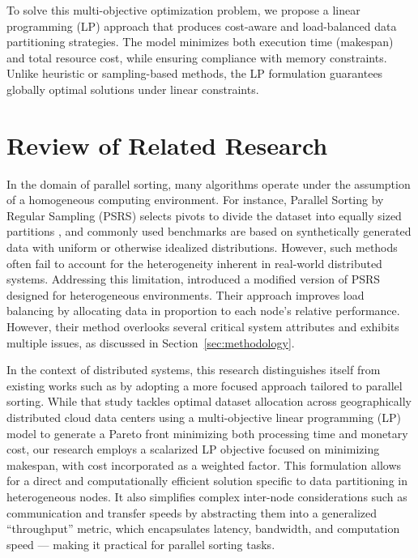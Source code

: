 \documentclass{article}
\begin{document}
To solve this multi-objective optimization problem, we propose a linear programming (LP) approach that produces cost-aware and load-balanced data partitioning strategies. The model minimizes both execution time (makespan) and total resource cost, while ensuring compliance with memory constraints. Unlike heuristic or sampling-based methods, the LP formulation guarantees globally optimal solutions under linear constraints. 

\vspace{3em}

\section{Review of Related Research}


In the domain of parallel sorting, many algorithms operate under the assumption of a homogeneous computing environment. For instance, Parallel Sorting by Regular Sampling (PSRS) selects pivots to divide the dataset into equally sized partitions \cite{tokuue_fugaku_2023}, and commonly used benchmarks are based on synthetically generated data with uniform or otherwise idealized distributions. However, such methods often fail to account for the heterogeneity inherent in real-world distributed systems. Addressing this limitation, \cite{monga_parallel_heterogeneous} introduced a modified version of PSRS designed for heterogeneous environments. Their approach improves load balancing by allocating data in proportion to each node's relative performance. However, their method overlooks several critical system attributes and exhibits multiple issues, as discussed in Section~\ref{sec:methodology}.

In the context of distributed systems, this research distinguishes itself from existing works such as \cite{yoon_optimal_2014} by adopting a more focused approach tailored to parallel sorting. While that study tackles optimal dataset allocation across geographically distributed cloud data centers using a multi-objective linear programming (LP) model to generate a Pareto front minimizing both processing time and monetary cost, our research employs a scalarized LP objective focused on minimizing makespan, with cost incorporated as a weighted factor. This formulation allows for a direct and computationally efficient solution specific to data partitioning in heterogeneous nodes. It also simplifies complex inter-node considerations such as communication and transfer speeds by abstracting them into a generalized “throughput” metric, which encapsulates latency, bandwidth, and computation speed — making it practical for parallel sorting tasks.
\end{document}
